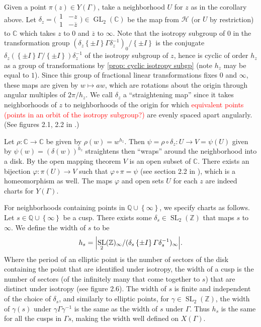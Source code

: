 \documentclass[10pt,leqno,twoside,b5paper]{article}
\theoremstyle{plain}
\theoremstyle{definition}
\numberwithin{equation}{section}
\numberwithin{lem}{section}
\newcommand{\cbr}[1]{\left\{#1\right\}}
\DeclareMathOperator{\GL}{GL}
\DeclareMathOperator{\SL}{SL}
\newcommand{\slz}{\SL_2(\mathbb{Z})}
\newcommand{\sai}[1]{\textcolor{red}{#1}}
\begin{document}
Given a point $\pi(z)\in Y(\varGamma)$, take a neighborhood $U$ for $z$ as in the corollary above. Let $\delta_z  = \big(\!\begin{smallmatrix}
    1 & -z \\ 1 & -\overline{z}
\end{smallmatrix}\!\big)\in \GL_2(\mathbb C)$ be the map from $\mathcal H$ (or $U$ by restriction) to $\mathbb C$ which takes $z$ to $0$ and $\overline{z}$ to $\infty$. Note that the isotropy subgroup of $0$ in the transformation group $(\delta_z\cbr{\pm I}\varGamma\delta_z^{-1})_0/\cbr{\pm I}$ is the conjugate $\delta_z(\cbr{\pm I}\varGamma/\cbr{\pm I})\delta_z^{-1}$ of the isotropy subgroup of $z$, hence is cyclic of order $h_z$ as a group of transformations by \cref{prop: cyclic isotropy subgp} (note $h_z$ may be equal to $1$). Since this group of fractional linear transformations fixes $0$ and $\infty$, these maps are given by $w\mapsto aw$, which are rotations about the origin through angular multiples of $2\pi/h_z$. We call $\delta_z$ a ``straightening map'' since it takes neighborhoods of $z$ to neighborhoods of the origin for which \sai{equivalent points (points in an orbit of the isotropy subgroup?)} are evenly spaced apart angularly. (See figures 2.1, 2.2 in \cite{diamond}.)

Let $\rho\colon \mathbb C\to \mathbb C$ be given by $\rho(w) = w^{h_z}$. Then $\psi = \rho\circ \delta_z \colon U\to V = \psi(U)$ given by $\psi(w) = (\delta(w))^{h_z}$ straightens then ``wraps'' around the neighborhood into a disk. By the open mapping theorem $V$ is an open subset of $\mathbb C$. There exists an bijection $\varphi\colon \pi(U)\to V$ such that $\varphi\circ\pi = \psi$ (see section 2.2 in \cite{diamond}), which is a homeomorphism as well. The maps $\varphi$ and open sets $U$ for each $z$ are indeed charts for $Y(\varGamma)$.

For neighborhoods containing points in $\mathbb Q\cup\cbr{\infty}$, we specify charts as follows. Let $s\in\mathbb Q\cup\cbr{\infty}$ be a cusp. There exists some $\delta_s\in\slz$ that maps $s$ to $\infty$. We define the width of $s$ to be 
\[h_s = \abs{\slz_\infty/(\delta_s\cbr{\pm I}\varGamma\delta_s^{-1})_\infty}.\] Where the period of an elliptic point is the number of sectors of the disk containing the point that are identified under isotropy, the width of a cusp is the number of sectors (of the infinitely many that come together to $s$) that are distinct under isotropy (see \cite{diamond} figure 2.6). The width of $s$ is finite and independent of the choice of $\delta_s$, and similarly to elliptic points, for $\gamma\in\slz$, the width of $\gamma(s)$ under $\gamma\varGamma\gamma^{-1}$ is the same as the width of $s$ under $\varGamma$. Thus $h_s$ is the same for all the cusps in $\varGamma s$, making the width well defined on $X(\varGamma)$.
\end{document}
